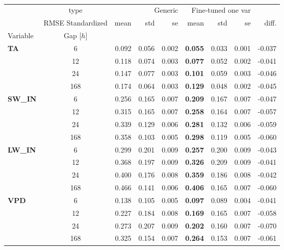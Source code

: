 \begin{table}
\centering
\caption{\CapGeneric}
\label{tbl:generic}
\begin{tabular}{p{2.1cm}c|rrr|rrr|r}
\toprule
 & type & \multicolumn{3}{r}{Generic} & \multicolumn{3}{r}{Fine-tuned one var} &  \\
 & RMSE Standardized & mean & std & se & mean & std & se & diff. \\
Variable & Gap [$h$] &  &  &  &  &  &  &  \\
\midrule
\multirow[c]{4}{*}{\parbox{2.1cm}{\textbf{TA}}} & 6 & 0.092 & 0.056 & 0.002 & \bfseries 0.055 & 0.033 & 0.001 & -0.037 \\
 & 12 & 0.118 & 0.074 & 0.003 & \bfseries 0.077 & 0.052 & 0.002 & -0.041 \\
 & 24 & 0.147 & 0.077 & 0.003 & \bfseries 0.101 & 0.059 & 0.003 & -0.046 \\
 & 168 & 0.174 & 0.064 & 0.003 & \bfseries 0.129 & 0.048 & 0.002 & -0.045 \\
\cline{1-9}
\multirow[c]{4}{*}{\parbox{2.1cm}{\textbf{SW\_IN}}} & 6 & 0.256 & 0.165 & 0.007 & \bfseries 0.209 & 0.167 & 0.007 & -0.047 \\
 & 12 & 0.315 & 0.165 & 0.007 & \bfseries 0.258 & 0.164 & 0.007 & -0.057 \\
 & 24 & 0.339 & 0.129 & 0.006 & \bfseries 0.281 & 0.132 & 0.006 & -0.059 \\
 & 168 & 0.358 & 0.103 & 0.005 & \bfseries 0.298 & 0.119 & 0.005 & -0.060 \\
\cline{1-9}
\multirow[c]{4}{*}{\parbox{2.1cm}{\textbf{LW\_IN}}} & 6 & 0.299 & 0.201 & 0.009 & \bfseries 0.257 & 0.200 & 0.009 & -0.043 \\
 & 12 & 0.368 & 0.197 & 0.009 & \bfseries 0.326 & 0.209 & 0.009 & -0.041 \\
 & 24 & 0.400 & 0.176 & 0.008 & \bfseries 0.359 & 0.186 & 0.008 & -0.042 \\
 & 168 & 0.466 & 0.141 & 0.006 & \bfseries 0.406 & 0.165 & 0.007 & -0.060 \\
\cline{1-9}
\multirow[c]{4}{*}{\parbox{2.1cm}{\textbf{VPD}}} & 6 & 0.138 & 0.105 & 0.005 & \bfseries 0.097 & 0.089 & 0.004 & -0.041 \\
 & 12 & 0.227 & 0.184 & 0.008 & \bfseries 0.169 & 0.165 & 0.007 & -0.058 \\
 & 24 & 0.273 & 0.207 & 0.009 & \bfseries 0.202 & 0.160 & 0.007 & -0.070 \\
 & 168 & 0.325 & 0.154 & 0.007 & \bfseries 0.264 & 0.153 & 0.007 & -0.061 \\

\end{tabular}
\end{table}
